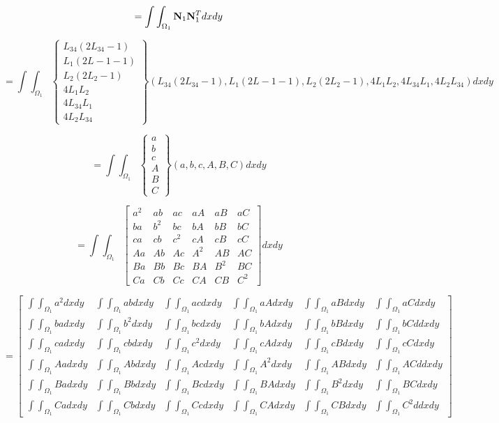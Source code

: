 \documentclass{jarticle}
\begin{document}
\[
=\int\int_{\Omega_1}{\bf N}_1{\bf N}_1^Tdxdy 
\]


\[
=\int\int_{\Omega_1}\left\{\begin{array}{c}
L_{34}(2L_{34}-1)\\
L_{1}(2L-{1}-1)\\
L_{2}(2L_{2}-1)\\
4L_{1}L_{2}\\
4L_{34}L_{1}\\
4L_{2}L_{34}
\end{array}\right\}(
L_{34}(2L_{34}-1),
L_{1}(2L-{1}-1),
L_{2}(2L_{2}-1),
4L_{1}L_{2},
4L_{34}L_{1},
4L_{2}L_{34}
)dxdy 
\]


\[
=\int\int_{\Omega_1}\left\{\begin{array}{c}
a\\
b\\
c\\
A\\
B\\
C
\end{array}\right\}(
a,b,c,A,B,C
)dxdy 
\]

\[
=\int\int_{\Omega_1}\left[\begin{array}{cccccc}
    a^2&ab&ac&aA&aB&aC\\
    ba&b^2&bc&bA&bB&bC\\
    ca&cb&c^2&cA&cB&cC\\
    Aa&Ab&Ac&A^2&AB&AC\\
    Ba&Bb&Bc&BA&B^2&BC\\
    Ca&Cb&Cc&CA&CB&C^2
\end{array}\right]dxdy
\]



\[
=\left[\begin{array}{cccccc}
    \int\int_{\Omega_1}a^2dxdy&\int\int_{\Omega_1}abdxdy&\int\int_{\Omega_1}acdxdy&\int\int_{\Omega_1}aAdxdy&\int\int_{\Omega_1}aBdxdy&\int\int_{\Omega_1}aCdxdy\\
    \int\int_{\Omega_1}badxdy&\int\int_{\Omega_1}b^2dxdy&\int\int_{\Omega_1}bcdxdy&\int\int_{\Omega_1}bAdxdy&\int\int_{\Omega_1}bBdxdy&\int\int_{\Omega_1}bCddxdy\\
    \int\int_{\Omega_1}cadxdy&\int\int_{\Omega_1}cbdxdy&\int\int_{\Omega_1}c^2dxdy&\int\int_{\Omega_1}cAdxdy&\int\int_{\Omega_1}cBdxdy&\int\int_{\Omega_1}cCdxdy\\
    \int\int_{\Omega_1}Aadxdy&\int\int_{\Omega_1}Abdxdy&\int\int_{\Omega_1}Acdxdy&\int\int_{\Omega_1}A^2dxdy&\int\int_{\Omega_1}ABdxdy&\int\int_{\Omega_1}ACddxdy\\
    \int\int_{\Omega_1}Badxdy&\int\int_{\Omega_1}Bbdxdy&\int\int_{\Omega_1}Bcdxdy&\int\int_{\Omega_1}BAdxdy&\int\int_{\Omega_1}B^2dxdy&\int\int_{\Omega_1}BCdxdy\\
    \int\int_{\Omega_1}Cadxdy&\int\int_{\Omega_1}Cbdxdy&\int\int_{\Omega_1}Ccdxdy&\int\int_{\Omega_1}CAdxdy&\int\int_{\Omega_1}CBdxdy&\int\int_{\Omega_1}C^2ddxdy
\end{array}\right]
\]
\end{document}
